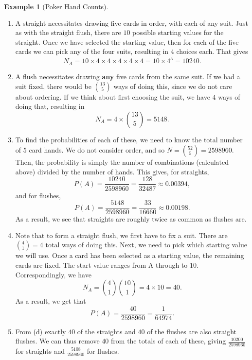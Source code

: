 \documentclass[
  letterpaper,
  DIV=11,
  numbers=noendperiod]{scrreprt}
\theoremstyle{definition}
\theoremstyle{definition}
\newtheorem{example}{Example}[chapter]
\theoremstyle{definition}
\theoremstyle{remark}
\begin{document}
\begin{example}[Poker Hand
Counts]
\begin{tcolorbox}[enhanced jigsaw, colback=white, colframe=quarto-callout-color-frame, arc=.35mm, leftrule=.75mm, rightrule=.15mm, opacityback=0, breakable, bottomrule=.15mm, left=2mm, toprule=.15mm]
\begin{enumerate}
\def\labelenumi{\alph{enumi}.}
\item
  A straight necessitates drawing five cards in order, with each of any
  suit. Just as with the straight flush, there are \(10\) possible
  starting values for the straight. Once we have selected the starting
  value, then for each of the five cards we can pick any of the four
  suits, resulting in \(4\) choices each. That gives
  \[N_A = 10\times 4\times 4\times 4\times 4\times 4 = 10\times 4^5 = 10240.\]
\item
  A flush necessitates drawing \textbf{any} five cards from the same
  suit. If we had a suit fixed, there would be \({13\choose 5}\) ways of
  doing this, since we do not care about ordering. If we think about
  first choosing the suit, we have \(4\) ways of doing that, resulting
  in \[N_A = 4 \times {13 \choose 5} = 5148.\]
\item
  To find the probabilities of each of these, we need to know the total
  number of \(5\) card hands. We do not consider order, and so
  \(N = \binom{52}{5} = 2598960\). Then, the probability is simply the
  number of combinations (calculated above) divided by the number of
  hands. This gives, for straights,
  \[P(A) = \frac{10240}{2598960} = \frac{128}{32487} \approx 0.00394,\]
  and for flushes,
  \[P(A) = \frac{5148}{2598960} = \frac{33}{16660} \approx 0.00198.\] As
  a result, we see that straights are roughly twice as common as flushes
  are.\footnotemark{}
\item
  Note that to form a straight flush, we first have to fix a suit. There
  are \({4\choose 1}=4\) total ways of doing this. Next, we need to pick
  which starting value we will use. Once a card has been selected as a
  starting value, the remaining cards are fixed. The start value ranges
  from A through to \(10\). Correspondingly, we have
  \[N_A = {4\choose 1}{10 \choose 1} = 4\times10 = 40.\] As a result, we
  get that \[P(A) = \frac{40}{2598960} = \frac{1}{64974}.\]
\item
  From (d) exactly \(40\) of the straights and \(40\) of the flushes are
  also straight flushes. We can thus remove \(40\) from the totals of
  each of these, giving \(\frac{10200}{2598960}\) for straights and
  \(\frac{5108}{2598960}\) for flushes.
\end{enumerate}

\end{tcolorbox}


\end{example}
\end{document}
